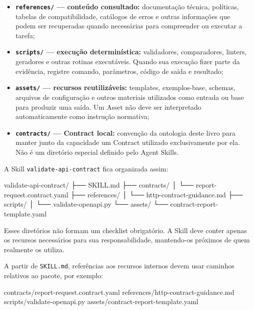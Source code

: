 \documentclass[
  10pt,
  a4paper,
  oneside]{book}
\newenvironment{Shaded}{}{}
\newcommand{\NormalTok}[1]{#1}
\providecommand{\tightlist}{%
  \setlength{\itemsep}{0pt}\setlength{\parskip}{0pt}}
\renewenvironment{Shaded}{\begin{snugshade}}{\end{snugshade}}%
\begin{document}
\begin{itemize}
\tightlist
\item
  \textbf{\texttt{references/} --- conteúdo consultado:} documentação
  técnica, políticas, tabelas de compatibilidade, catálogos de erros e
  outras informações que podem ser recuperadas quando necessárias para
  compreender ou executar a tarefa;
\item
  \textbf{\texttt{scripts/} --- execução determinística:} validadores,
  comparadores, linters, geradores e outras rotinas executáveis. Quando
  sua execução fizer parte da evidência, registre comando, parâmetros,
  código de saída e resultado;
\item
  \textbf{\texttt{assets/} --- recursos reutilizáveis:} templates,
  exemplos-base, schemas, arquivos de configuração e outros materiais
  utilizados como entrada ou base para produzir uma saída. Um Asset não
  deve ser interpretado automaticamente como instrução normativa;
\item
  \textbf{\texttt{contracts/} --- Contract local:} convenção da
  ontologia deste livro para manter junto da capacidade um Contract
  utilizado exclusivamente por ela. Não é um diretório especial definido
  pelo Agent Skills.
\end{itemize}

A Skill \texttt{validate-api-contract} fica organizada assim:

\begin{Shaded}
\begin{Highlighting}[]
\NormalTok{validate{-}api{-}contract/}
\NormalTok{├── SKILL.md}
\NormalTok{├── contracts/}
\NormalTok{│   └── report{-}request.contract.yaml}
\NormalTok{├── references/}
\NormalTok{│   └── http{-}contract{-}guidance.md}
\NormalTok{├── scripts/}
\NormalTok{│   └── validate{-}openapi.py}
\NormalTok{└── assets/}
\NormalTok{    └── contract{-}report{-}template.yaml}
\end{Highlighting}
\end{Shaded}

Esses diretórios não formam um checklist obrigatório. A Skill deve
conter apenas os recursos necessários para sua responsabilidade,
mantendo-os próximos de quem realmente os utiliza.

A partir de \texttt{SKILL.md}, referências aos recursos internos devem
usar caminhos relativos ao pacote, por exemplo:

\begin{Shaded}
\begin{Highlighting}[]
\NormalTok{contracts/report{-}request.contract.yaml}
\NormalTok{references/http{-}contract{-}guidance.md}
\NormalTok{scripts/validate{-}openapi.py}
\NormalTok{assets/contract{-}report{-}template.yaml}
\end{Highlighting}
\end{Shaded}
\end{document}
